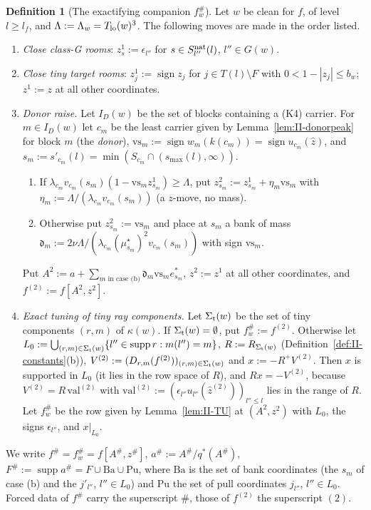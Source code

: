 \documentclass[10pt]{amsart}
\theoremstyle{definition}
\newtheorem{definition}[theorem]{Definition}
\theoremstyle{remark}
\newcommand{\supp}{\operatorname{supp}}
\newcommand{\sgn}{\operatorname{sign}}
\newcommand{\zh}{\hat z}
\begin{document}
\begin{definition}[The exactifying companion $f^\#_w$]\label{def:II-companionw}
Let $w$ be clean for $f$, of level $l\ge l_f$, and $\Lambda:=\Lambda_w=
T_{\rm lo}(w)^3$.  The following moves are made in the order listed.
\begin{enumerate}
\item[(C1)] \emph{Close class-G rooms}: $z^1_s:=\epsilon_{l''}$ for $s\in
S^{\rm nat}_{l''}(l)$, $l''\in G(w)$.
\item[(C2)] \emph{Close tiny target rooms}: $z^1_j:=\sgn z_j$ for $j\in
T(l)\setminus F$ with $0<1-|z_j|\le b_w$; $z^1:=z$ at all other coordinates.
\item[(C3)] \emph{Donor raise.}  Let $I_D(w)$ be the set of blocks
containing a (K4) carrier.  For $m\in I_D(w)$ let $c_m$ be the least
carrier given by Lemma~\textup{\ref{lem:II-donorpeak}} for block $m$ (the
\emph{donor}), $\mathrm{vs}_m:=\sgn w_m(k(c_m))=\sgn u_{c_m}(\zh)$, and
$s_m:=s'_{c_m}(l)=\min(S_{c_m}\cap(s_{\max}(l),\infty))$.
 \begin{enumerate}
 \item[(a)] If $\lambda_{c_m}v_{c_m}(s_m)(1-\mathrm{vs}_mz^1_{s_m})\ge
 \Lambda$, put $z^2_{s_m}:=z^1_{s_m}+\eta_m\mathrm{vs}_m$ with
 $\eta_m:=\Lambda/(\lambda_{c_m}v_{c_m}(s_m))$ (a $z$-move, no mass).
 \item[(b)] Otherwise put $z^2_{s_m}:=\mathrm{vs}_m$ and place at $s_m$ a
 bank of mass $\mathfrak d_m:=2\nu\Lambda/(\lambda_{c_m}(\mu^\star_{s_m})^2
 v_{c_m}(s_m))$ with sign $\mathrm{vs}_m$.
 \end{enumerate}
 Put $A^2:=a+\sum_{m\text{ in case (b)}}\mathfrak d_m\mathrm{vs}_me^*_{s_m}$,
 $z^2:=z^1$ at all other coordinates, and $f^{(2)}:=f[A^2,z^2]$.
\item[(C4)] \emph{Exact tuning of tiny ray components.}  Let
$\Sigma_{\rm t}(w)$ be the set of tiny components $(r,m)$ of $\kappa(w)$.  If
$\Sigma_{\rm t}(w)=\emptyset$, put $f^\#_w:=f^{(2)}$.  Otherwise let
$L_0:=\bigcup_{(r,m)\in\Sigma_{\rm t}(w)}\{l''\in\supp r:m(l'')=m\}$,
$R:=R_{\Sigma_{\rm t}(w)}$ (Definition~\ref{def:II-constants}(b)),
$V^{(2)}:=(D_{r,m}(f^{(2)}))_{(r,m)\in\Sigma_{\rm t}(w)}$ and $x:=-R^+
V^{(2)}$.  Then $x$ is supported in $L_0$ (it lies in the row space of
$R$), and $Rx=-V^{(2)}$, because $V^{(2)}=R\,\mathrm{val}^{(2)}$ with
$\mathrm{val}^{(2)}:=(\epsilon_{l''}u_{l''}(\zh^{(2)}))_{l''\le l}$ lies in
the range of $R$.  Let $f^\#_w$ be the row given by
Lemma~\textup{\ref{lem:II-TU}} at $(A^2,z^2)$ with $L_0$, the signs
$\epsilon_{l''}$, and $x|_{L_0}$.
\end{enumerate}
We write $f^\#=f^\#_w=f[A^\#,z^\#]$, $a^\#:=A^\#/q^*(A^\#)$, $F^\#:=
\supp a^\#=F\cup\mathrm{Ba}\cup\mathrm{Pu}$, where $\mathrm{Ba}$ is the set
of bank coordinates (the $s_m$ of case (b) and the $j'_{l''}$, $l''\in L_0$)
and $\mathrm{Pu}$ the set of pull coordinates $j_{l''}$, $l''\in L_0$.
Forced data of $f^\#$ carry the superscript $\#$, those of $f^{(2)}$ the
superscript $(2)$.
\end{definition}
\end{document}
